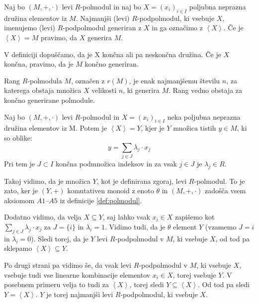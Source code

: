 \documentclass[mat1]{fmfdelo}
\newcommand{\Gen}[1]{\ensuremath{\left<{#1}\right>}}
\begin{document}
\begin{definicija}
	Naj bo $(M, +, \cdot)$ levi $R$-polmodul in naj bo $X = (x_i)_{i\in I}$ poljubna neprazna družina elementov iz $M$. Najmanjši (levi) $R$-podpolmodul, ki vsebuje $X$, imenujemo (levi) $R$-podpolmodul generiran z $X$ in ga označimo z \Gen{X}. Če je $\Gen{X} = M$ pravimo, da $X$ generira $M$.
\end{definicija}

\begin{opomba}
	V definiciji dopuščamo, da je X končna ali pa neskončna družina. Če je $X$ končna, pravimo, da je $M$ končno generiran.
\end{opomba}

\begin{definicija}
	Rang $R$-polmodula $M$, označen z $r(M)$, je enak najmanjšemu številu $n$, za katerega obstaja množica $X$ velikosti $n$, ki generira $M$. Rang vedno obstaja za končno generirane polmodule.
\end{definicija}

\begin{trditev}
	Naj bo $(M, +, \cdot)$ levi $R$-polmodul in $X = (x_i)_{i\in I}$ neka poljubna neprazna družina elementov iz M. Potem je $\Gen{X} = Y$, kjer je $Y$  množica tistih $y\in M$, ki so oblike: $$ y = \sum_{j\in J} \lambda_j \cdot x_j$$ Pri tem je $J\subset I$ končna podmnožica indeksov in za vsak $j\in J$ je $\lambda_j \in R$.
\end{trditev}

\begin{dokaz}
	
	Takoj vidimo, da je množica $Y$, kot je definirana zgoraj, levi $R$-polmodul. To je zato, ker je $(Y, +)$ komutativen monoid z enoto $\theta$ in $(M, +, \cdot)$ zadošča vsem aksiomom $A1$--$A5$ iz definicije \ref{def:polmodul}.
	
	Dodatno vidimo, da velja $X \subseteq Y$, saj lahko vsak $x_i\in X$ zapišemo kot $\sum_{j\in J}\lambda_j\cdot x_j$ za $J = \{i\}$ in $\lambda_i = 1$. Vidimo tudi, da je $\theta$ element $Y$ (vzamemo $J = {i}$ in $\lambda_i = 0$). Sledi torej, da je $Y$ levi $R$-podpolmodul v $M$, ki vsebuje $X$, od tod pa sklepamo $\Gen{X} \subseteq Y$. 
	
	Po drugi strani pa vidimo še, da vsak levi $R$-podpolmodul v $M$, ki vsebuje $X$, vsebuje tudi vse linearne kombinacije elementov $x_i\in X$, torej vsebuje $Y$. V posebnem primeru velja to tudi za \Gen{X}, torej sledi $Y \subseteq \Gen{X}$. Od tod pa sledi $Y = \Gen{X}$. $Y$ je torej najmanjši levi $R$-podpolmodul, ki vsebuje $X$.
\end{dokaz}
\end{document}
